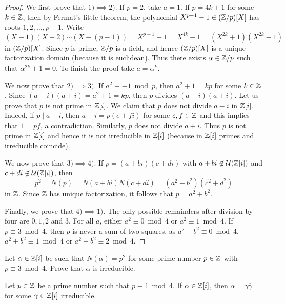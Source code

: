 \begin{proof}
    We first prove that $1)\implies 2)$. If $p=2$, take $a=1$. If $p=4k+1$ for some $k\in\mathbb{Z}$, then
    by Fermat's little theorem, the polynomial 
    $X^{p-1}-1\in(\mathbb{Z}/p)[X]$ has roots $1,2,\dots,p-1$. Write
    \[
    (X-1)(X-2)\cdots (X-(p-1))=X^{p-1}-1=X^{4k}-1=(X^{2k}+1)(X^{2k}-1)
    \]
    in $(\mathbb{Z}/p)[X]$. Since $p$ is prime, $\mathbb{Z}/p$ is a field, and hence 
    $(\mathbb{Z}/p)[X]$ is a unique factorization domain (because it is euclidean). Thus 
    there exists $\alpha\in\mathbb{Z}/p$ such that $\alpha^{2k}+1=0$. To finish the proof
    take $a=\alpha^k$. 
    
    We now prove that $2)\implies 3)$. If $a^2\equiv-1\bmod p$, then $a^2+1=kp$ 
    for some $k\in\mathbb{Z}$. Since $(a-i)(a+i)=a^2+1=kp$, then $p$ divides $(a-i)(a+i)$. Let us prove that $p$ is not prime in $\mathbb{Z}[i]$. 
    We claim that $p$ does not divide $a-i$ in $\mathbb{Z}[i]$. Indeed, if $p\mid a-i$, then
    $a-i=p(e+fi)$ for some $e,f\in\mathbb{Z}$ and this implies that $1=pf$, a contradiction. Similarly,
    $p$ does not divide $a+i$. Thus $p$ is not prime in $\mathbb{Z}[i]$ 
    and hence it is not irreducible in $\mathbb{Z}[i]$ (because in $\mathbb{Z}[i]$ primes and irreducible coincide). 
    
    We now prove that $3)\implies 4)$. If $p=(a+bi)(c+di)$ with $a+bi\not\in\mathcal{U}(\mathbb{Z}[i])$
    and  $c+di\not\in\mathcal{U}(\mathbb{Z}[i])$, then
    \[
    p^2=N(p)=N(a+bi)N(c+di)=(a^2+b^2)(c^2+d^2)
    \]
    in $\mathbb{Z}$. Since $\mathbb{Z}$ has unique factorization, it follows that $p=a^2+b^2$. 
    
    Finally, we prove that $4)\implies 1)$. 
    The only possible remainders after division by four are $0,1,2$ and $3$.  
    For all $a$, either $a^2\equiv 0\bmod 4$ or $a^2\equiv 1\bmod 4$. 
    If $p\equiv3\bmod 4$, then $p$ is never a sum of two squares, as 
    $a^2+b^2\equiv 0\bmod 4$, $a^2+b^2\equiv 1\bmod 4$ or $a^2+b^2\equiv 2\bmod 4$. 
\end{proof}

\begin{exercise}
\label{xca:p=3(4)}
    Let $\alpha\in\mathbb{Z}[i]$ be such that $N(\alpha)=p^2$ 
    for some prime number $p\in\mathbb{Z}$ with $p\equiv3\bmod 4$. 
    Prove that $\alpha$ is irreducible. 
\end{exercise}

\begin{exercise}
    \label{xca:p=1(4)}
    Let $p\in\mathbb{Z}$ be a prime number such that $p\equiv1\bmod 4$.
    If $\alpha\in\mathbb{Z}[i]$, then $\alpha=\gamma\overline{\gamma}$
    for some $\gamma\in\mathbb{Z}[i]$ irreducible. 
\end{exercise}

